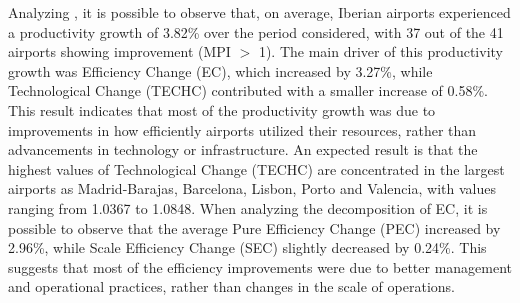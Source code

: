Analyzing , it is possible to observe that, on average, Iberian airports experienced a productivity growth of 3.82\% over the period considered, with 37 out of the 41 airports showing improvement  (MPI $>$ 1). The main driver of this productivity growth was Efficiency Change (EC), which increased by 3.27\%, while Technological Change (TECHC) contributed with a smaller increase of 0.58\%. This result indicates that most of the productivity growth was due to improvements in how efficiently airports utilized their resources, rather than advancements in technology or infrastructure. An expected result is that the highest values of Technological Change (TECHC) are concentrated in
the largest airports as Madrid-Barajas, Barcelona, Lisbon, Porto and Valencia, with values ranging from
1.0367 to 1.0848. When analyzing the decomposition of EC, it is possible to observe that the average Pure Efficiency
Change (PEC) increased by 2.96\%, while Scale Efficiency Change (SEC) slightly decreased by 0.24\%.
This suggests that most of the efficiency improvements were due to better management and operational
practices, rather than changes in the scale of operations.


